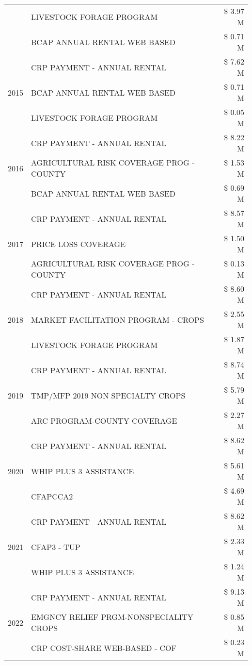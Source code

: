 \begin{tabular}{llr}
 & LIVESTOCK FORAGE PROGRAM & \$ 3.97 M \\
 & BCAP ANNUAL RENTAL WEB BASED & \$ 0.71 M \\
\cline{1-3}
\multirow[t]{3}{*}{2015} & CRP PAYMENT - ANNUAL RENTAL & \$ 7.62 M \\
 & BCAP ANNUAL RENTAL WEB BASED & \$ 0.71 M \\
 & LIVESTOCK FORAGE PROGRAM & \$ 0.05 M \\
\cline{1-3}
\multirow[t]{3}{*}{2016} & CRP PAYMENT - ANNUAL RENTAL & \$ 8.22 M \\
 & AGRICULTURAL RISK COVERAGE PROG - COUNTY & \$ 1.53 M \\
 & BCAP ANNUAL RENTAL WEB BASED & \$ 0.69 M \\
\cline{1-3}
\multirow[t]{3}{*}{2017} & CRP PAYMENT - ANNUAL RENTAL & \$ 8.57 M \\
 & PRICE LOSS COVERAGE & \$ 1.50 M \\
 & AGRICULTURAL RISK COVERAGE PROG - COUNTY & \$ 0.13 M \\
\cline{1-3}
\multirow[t]{3}{*}{2018} & CRP PAYMENT - ANNUAL RENTAL & \$ 8.60 M \\
 & MARKET FACILITATION PROGRAM - CROPS & \$ 2.55 M \\
 & LIVESTOCK FORAGE PROGRAM & \$ 1.87 M \\
\cline{1-3}
\multirow[t]{3}{*}{2019} & CRP PAYMENT - ANNUAL RENTAL & \$ 8.74 M \\
 & TMP/MFP 2019 NON SPECIALTY CROPS & \$ 5.79 M \\
 & ARC PROGRAM-COUNTY COVERAGE & \$ 2.27 M \\
\cline{1-3}
\multirow[t]{3}{*}{2020} & CRP PAYMENT - ANNUAL RENTAL & \$ 8.62 M \\
 & WHIP PLUS 3 ASSISTANCE & \$ 5.61 M \\
 & CFAPCCA2 & \$ 4.69 M \\
\cline{1-3}
\multirow[t]{3}{*}{2021} & CRP PAYMENT - ANNUAL RENTAL & \$ 8.62 M \\
 & CFAP3 - TUP & \$ 2.33 M \\
 & WHIP PLUS 3 ASSISTANCE & \$ 1.24 M \\
\cline{1-3}
\multirow[t]{3}{*}{2022} & CRP PAYMENT - ANNUAL RENTAL & \$ 9.13 M \\
 & EMGNCY RELIEF PRGM-NONSPECIALITY CROPS & \$ 0.85 M \\
 & CRP COST-SHARE WEB-BASED - COF & \$ 0.23 M \\
\cline{1-3}
\bottomrule
\end{tabular}
